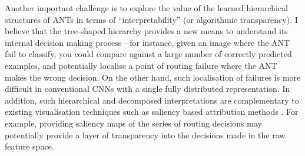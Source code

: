 
Another important challenge is to explore the value of the learned hierarchical structures of ANTs  in terms of “interpretability” (or algorithmic transparency). I believe that the tree-shaped hierarchy provides a new means to understand its internal decision making process---for instance, given an image where the ANT fail to classify, you could compare against a large number of correctly predicted examples, and potentially localise a point of routing failure where the ANT makes the wrong decision. On the other hand, such localisation of failures is more difficult in conventional CNNs with a single fully distributed representation. In addition, such hierarchical and decomposed interpretations are complementary to existing visualisation techniques such as saliency based attribution methods \cite{guidotti2018survey}. For example, providing saliency maps of the series of routing decisions may potentially provide a layer of transparency into the decisions made in the raw feature space. 



